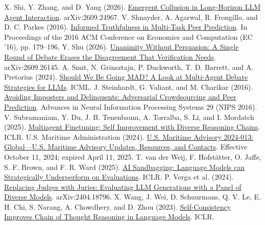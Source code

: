 \begin{thebibliography}{}
 X. Shi, Y. Zhang, and D. Yang (2026). \href{https://arxiv.org/abs/2609.24967}{Emergent Collusion in Long-Horizon LLM Agent Interaction}. arXiv:2609.24967.
 V. Shnayder, A. Agarwal, R. Frongillo, and D. C. Parkes (2016). \href{https://doi.org/10.1145/2940716.2940790}{Informed Truthfulness in Multi-Task Peer Prediction}. In Proceedings of the 2016 ACM Conference on Economics and Computation (EC '16), pp. 179--196.
 Y. Shu (2026). \href{https://arxiv.org/abs/2609.26145}{Unanimity Without Persuasion: A Single Round of Debate Erases the Disagreement That Verification Needs}. arXiv:2609.26145.
 A. Smit, N. Grinsztajn, P. Duckworth, T. D. Barrett, and A. Pretorius (2024). \href{https://proceedings.mlr.press/v235/smit24a.html}{Should We Be Going MAD? A Look at Multi-Agent Debate Strategies for LLMs}. ICML.
 J. Steinhardt, G. Valiant, and M. Charikar (2016). \href{https://papers.nips.cc/paper_files/paper/2016/hash/0a87257e5308197df43230edf4ad1dae-Abstract.html}{Avoiding Imposters and Delinquents: Adversarial Crowdsourcing and Peer Prediction}. Advances in Neural Information Processing Systems 29 (NIPS 2016).
 V. Subramaniam, Y. Du, J. B. Tenenbaum, A. Torralba, S. Li, and I. Mordatch (2025). \href{https://openreview.net/forum?id=JtGPIZpOrz}{Multiagent Finetuning: Self Improvement with Diverse Reasoning Chains}. ICLR.
 U.S. Maritime Administration (2024). \href{https://www.maritime.dot.gov/msci/2024-013-global-us-maritime-advisory-updates-resources-and-contacts}{U.S. Maritime Advisory 2024-013: Global---U.S. Maritime Advisory Updates, Resources, and Contacts}. Effective October 11, 2024; expired April 11, 2025.
 T. van der Weij, F. Hofst\"atter, O. Jaffe, S. F. Brown, and F. R. Ward (2025). \href{https://openreview.net/forum?id=7Qa2SpjxIS}{AI Sandbagging: Language Models can Strategically Underperform on Evaluations}. ICLR.
 P. Verga et al. (2024). \href{https://arxiv.org/abs/2404.18796}{Replacing Judges with Juries: Evaluating LLM Generations with a Panel of Diverse Models}. arXiv:2404.18796.
 X. Wang, J. Wei, D. Schuurmans, Q. V. Le, E. H. Chi, S. Narang, A. Chowdhery, and D. Zhou (2023). \href{https://openreview.net/forum?id=1PL1NIMMrw}{Self-Consistency Improves Chain of Thought Reasoning in Language Models}. ICLR.

\end{thebibliography}
